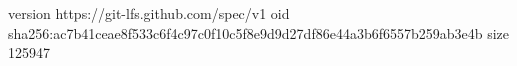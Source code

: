 version https://git-lfs.github.com/spec/v1
oid sha256:ac7b41ceae8f533c6f4c97c0f10c5f8e9d9d27df86e44a3b6f6557b259ab3e4b
size 125947
